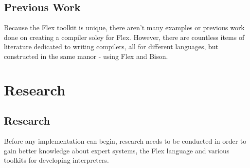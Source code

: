 \documentclass[12pt]{report}
\begin{document}
\section{Previous Work}\label{sec:previous_work}
Because the Flex toolkit is unique, there aren't many examples or previous work done on creating a compiler soley for Flex.  However, there are countless items of literature dedicated to writing compilers, all for different languages, but constructed in the same manor - using Flex and Bison.

\chapter{Research}
\section[Research]{Research}\label{sec:intro_to_research}
Before any implementation can begin, research needs to be conducted in order to gain better knowledge about expert systems, the Flex language and various toolkits for developing interpreters.
\end{document}
